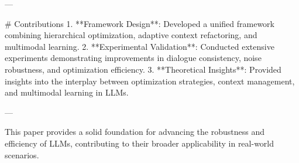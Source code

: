 ---

# Contributions  
1. **Framework Design**: Developed a unified framework combining hierarchical optimization, adaptive context refactoring, and multimodal learning.  
2. **Experimental Validation**: Conducted extensive experiments demonstrating improvements in dialogue consistency, noise robustness, and optimization efficiency.  
3. **Theoretical Insights**: Provided insights into the interplay between optimization strategies, context management, and multimodal learning in LLMs.  

--- 

This paper provides a solid foundation for advancing the robustness and efficiency of LLMs, contributing to their broader applicability in real-world scenarios.